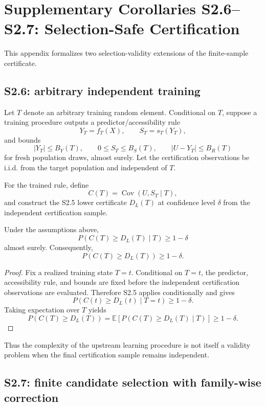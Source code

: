 \section{Supplementary Corollaries S2.6--S2.7: Selection-Safe Certification}

This appendix formalizes two selection-validity extensions of the finite-sample certificate.

\subsection{S2.6: arbitrary independent training}

Let $T$ denote an arbitrary training random element. Conditional on $T$, suppose a training procedure outputs a predictor/accessibility rule
\[
Y_T=f_T(X),
\qquad
S_T=s_T(Y_T),
\]
and bounds
\[
|Y_T|\le B_Y(T),
\qquad
0\le S_T\le B_S(T),
\qquad
|U-Y_T|\le B_R(T)
\]
for fresh population draws, almost surely. Let the certification observations be i.i.d. from the target population and independent of $T$.

For the trained rule, define
\[
C(T)=\operatorname{Cov}(U,S_T\mid T),
\]
and construct the S2.5 lower certificate $D_L(T)$ at confidence level $\delta$ from the independent certification sample.

\begin{corollary}
Under the assumptions above,
\[
P\!\left(C(T)\ge D_L(T)\mid T\right)\ge1-\delta
\]
almost surely. Consequently,
\[
P\!\left(C(T)\ge D_L(T)\right)\ge1-\delta.
\]
\end{corollary}

\begin{proof}
Fix a realized training state $T=t$. Conditional on $T=t$, the predictor, accessibility rule, and bounds are fixed before the independent certification observations are evaluated. Therefore S2.5 applies conditionally and gives
\[
P\!\left(C(t)\ge D_L(t)\mid T=t\right)\ge1-\delta.
\]
Taking expectation over $T$ yields
\[
P(C(T)\ge D_L(T))
=
\mathbb E\!\left[P(C(T)\ge D_L(T)\mid T)\right]
\ge1-\delta.
\]
\end{proof}

Thus the complexity of the upstream learning procedure is not itself a validity problem when the final certification sample remains independent.

\subsection{S2.7: finite candidate selection with family-wise correction}

